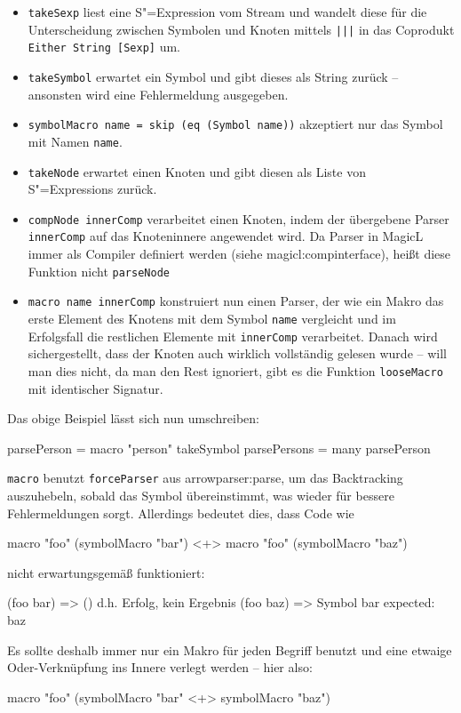 \documentclass[12pt, a4paper, bibgerm]{scrbook}
\newenvironment{DIFnomarkup}{}{}
\newcommand\icode[1]{\lstinline?#1?}
\newcommand\sref{}
\newcommand{\sexp}{S"=Expression}
\newcommand{\sexps}{S"=Expressions}
\begin{document}
\begin{itemize}
\item \icode{takeSexp} liest eine \sexp{} vom Stream und wandelt diese
  für die Unterscheidung zwischen Symbolen und Knoten mittels
  \icode{|||} in das Coprodukt \icode{Either String [Sexp]} um.
\item \icode{takeSymbol} erwartet ein Symbol und gibt dieses als String
  zurück -- ansonsten wird eine Fehlermeldung ausgegeben.
\item \icode{symbolMacro name = skip (eq (Symbol name))} akzeptiert nur
  das Symbol mit Namen \icode{name}.
\item \icode{takeNode} erwartet einen Knoten und gibt diesen als Liste
  von \sexps{} zurück.
\item \icode{compNode innerComp} verarbeitet einen Knoten, indem der
  übergebene Parser \icode{innerComp} auf das Knoteninnere angewendet
  wird. Da Parser in MagicL immer als Compiler definiert werden (siehe
  \sref{magicl:compinterface}), heißt diese Funktion nicht
  \icode{parseNode}
\item \icode{macro name innerComp} %
  konstruiert nun einen Parser, der wie ein Makro das erste Element des
  Knotens mit dem Symbol \icode{name} vergleicht und im Erfolgsfall die
  restlichen Elemente mit \icode{innerComp} verarbeitet. Danach wird
  sichergestellt, dass der Knoten auch wirklich vollständig gelesen
  wurde -- will man dies nicht, da man den Rest ignoriert, gibt es die
  Funktion \icode{looseMacro} mit identischer Signatur.
\end{itemize}
Das obige Beispiel lässt sich nun umschreiben:
\begin{DIFnomarkup}\begin{code}
parsePerson  = macro "person" takeSymbol
parsePersons = many parsePerson
\end{code}\end{DIFnomarkup}

\icode{macro} benutzt \icode{forceParser} aus
\sref{arrowparser:parse}, um das Backtracking auszuhebeln, sobald das
Symbol übereinstimmt, was wieder für bessere Fehlermeldungen
sorgt. Allerdings bedeutet dies, dass Code wie
\begin{DIFnomarkup}\begin{code}
macro "foo" (symbolMacro "bar") <+> macro "foo" (symbolMacro "baz")
\end{code}\end{DIFnomarkup}
nicht erwartungsgemäß funktioniert:
\begin{DIFnomarkup}\begin{code}
(foo bar)   => ()  d.h. Erfolg, kein Ergebnis
(foo baz)   => Symbol bar expected: baz
\end{code}\end{DIFnomarkup}
Es sollte deshalb immer nur ein Makro für jeden Begriff benutzt und
eine etwaige Oder-Verknüpfung ins Innere verlegt werden -- hier also:
\begin{DIFnomarkup}\begin{code}
macro "foo" (symbolMacro "bar" <+> symbolMacro "baz")
\end{code}\end{DIFnomarkup}
\end{document}
